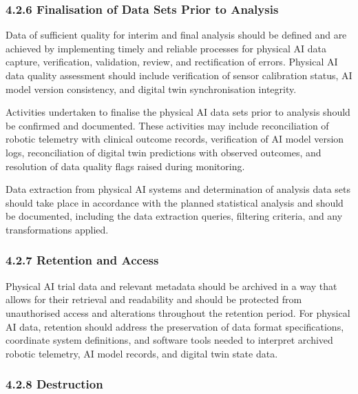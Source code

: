 \subsubsection{4.2.6 Finalisation of Data Sets Prior to Analysis}

\begin{description}[leftmargin=2.5cm,style=sameline]

\item[(a)] Data of sufficient quality for interim and final analysis should be defined and are achieved by implementing timely and reliable processes for physical AI data capture, verification, validation, review, and rectification of errors. Physical AI data quality assessment should include verification of sensor calibration status, AI model version consistency, and digital twin synchronisation integrity.

\item[(b)] Activities undertaken to finalise the physical AI data sets prior to analysis should be confirmed and documented. These activities may include reconciliation of robotic telemetry with clinical outcome records, verification of AI model version logs, reconciliation of digital twin predictions with observed outcomes, and resolution of data quality flags raised during monitoring.

\item[(c)] Data extraction from physical AI systems and determination of analysis data sets should take place in accordance with the planned statistical analysis and should be documented, including the data extraction queries, filtering criteria, and any transformations applied.

\end{description}

\subsubsection{4.2.7 Retention and Access}

Physical AI trial data and relevant metadata should be archived in a way that allows for their retrieval and readability and should be protected from unauthorised access and alterations throughout the retention period. For physical AI data, retention should address the preservation of data format specifications, coordinate system definitions, and software tools needed to interpret archived robotic telemetry, AI model records, and digital twin state data.

\subsubsection{4.2.8 Destruction}

